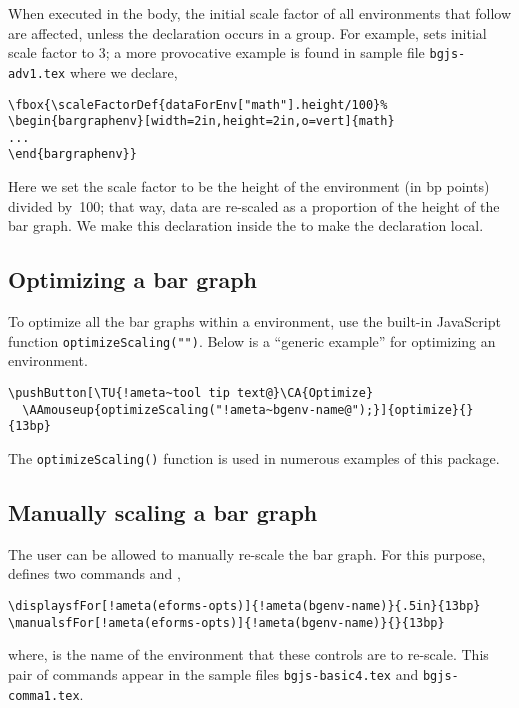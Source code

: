 \documentclass{article}
\edef\amtIndent{\the\parindent}
\begin{document}
When executed in
the body, the initial scale factor of all  environments that
follow are affected, unless the declaration occurs in a group. For example,
 sets initial scale factor to 3; a more
provocative example is found in sample file \texttt{bgjs-adv1.tex} where we
declare,
\begin{Verbatim}[xleftmargin=\amtIndent]
\fbox{\scaleFactorDef{dataForEnv["math"].height/100}%
\begin{bargraphenv}[width=2in,height=2in,o=vert]{math}
...
\end{bargraphenv}}
\end{Verbatim}
Here we set the scale factor to be the height of the environment (in bp
points) divided by~100; that way, data are re-scaled as a proportion of the
height of the bar graph. We make this declaration inside the  to
make the declaration local.

\subsection{Optimizing a bar graph}

To optimize all the bar graphs within a  environment, use the built-in
JavaScript function \texttt{optimizeScaling("")}. Below is a ``generic
example'' for optimizing an environment.
\begin{Verbatim}[xleftmargin=\amtIndent,commandchars={!~@}]
\pushButton[\TU{!ameta~tool tip text@}\CA{Optimize}
  \AAmouseup{optimizeScaling("!ameta~bgenv-name@");}]{optimize}{}{13bp}
\end{Verbatim}
The \texttt{optimizeScaling()} function is used in numerous examples of this package.

\subsection{Manually scaling a bar graph}

The user can be allowed to manually re-scale the bar graph. For this purpose,
 defines two commands  and ,
\begin{Verbatim}[xleftmargin=\amtIndent,commandchars={!()}]
\displaysfFor[!ameta(eforms-opts)]{!ameta(bgenv-name)}{.5in}{13bp}
\manualsfFor[!ameta(eforms-opts)]{!ameta(bgenv-name)}{}{13bp}
\end{Verbatim}
where,  is the name of the  environment
that these controls are to re-scale. This pair of commands appear in the
sample files \texttt{bgjs-basic4.tex} and \texttt{bgjs-comma1.tex}.
\end{document}
